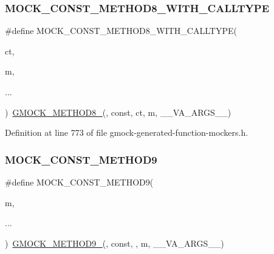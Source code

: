 \subsubsection{\texorpdfstring{M\+O\+C\+K\+\_\+\+C\+O\+N\+S\+T\+\_\+\+M\+E\+T\+H\+O\+D8\+\_\+\+W\+I\+T\+H\+\_\+\+C\+A\+L\+L\+T\+Y\+PE}{MOCK\_CONST\_METHOD8\_WITH\_CALLTYPE}}
{\footnotesize\ttfamily \#define M\+O\+C\+K\+\_\+\+C\+O\+N\+S\+T\+\_\+\+M\+E\+T\+H\+O\+D8\+\_\+\+W\+I\+T\+H\+\_\+\+C\+A\+L\+L\+T\+Y\+PE(\begin{DoxyParamCaption}\item[{}]{ct,  }\item[{}]{m,  }\item[{}]{... }\end{DoxyParamCaption})~\hyperlink{gmock-generated-function-mockers_8h_aa84a36427c44505207b7cad5dec7ad67}{G\+M\+O\+C\+K\+\_\+\+M\+E\+T\+H\+O\+D8\+\_\+}(, const, ct, m, \+\_\+\+\_\+\+V\+A\+\_\+\+A\+R\+G\+S\+\_\+\+\_\+)}



Definition at line 773 of file gmock-\/generated-\/function-\/mockers.\+h.

\mbox{\label{gmock-generated-function-mockers_8h_ab7429646bacf56a7d560a3d81d497880}} 
\subsubsection{\texorpdfstring{M\+O\+C\+K\+\_\+\+C\+O\+N\+S\+T\+\_\+\+M\+E\+T\+H\+O\+D9}{MOCK\_CONST\_METHOD9}}
{\footnotesize\ttfamily \#define M\+O\+C\+K\+\_\+\+C\+O\+N\+S\+T\+\_\+\+M\+E\+T\+H\+O\+D9(\begin{DoxyParamCaption}\item[{}]{m,  }\item[{}]{... }\end{DoxyParamCaption})~\hyperlink{gmock-generated-function-mockers_8h_aa820171a19cc587c247dbe05cbffc55f}{G\+M\+O\+C\+K\+\_\+\+M\+E\+T\+H\+O\+D9\+\_\+}(, const, , m, \+\_\+\+\_\+\+V\+A\+\_\+\+A\+R\+G\+S\+\_\+\+\_\+)}



